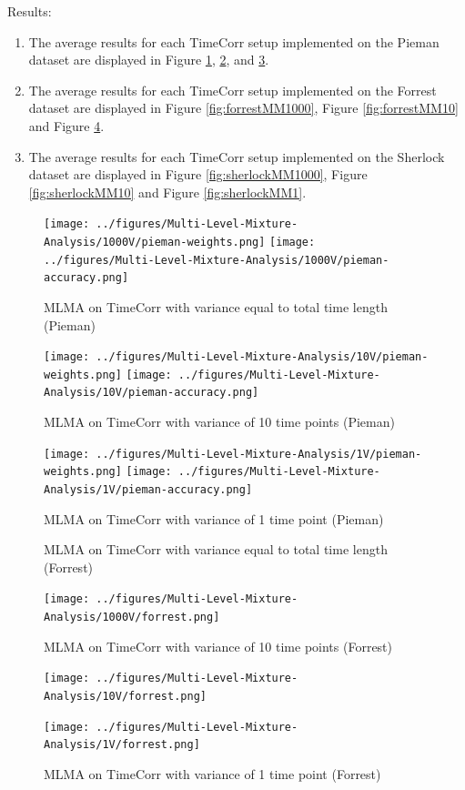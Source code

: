 \documentclass[11pt]{article}
\begin{document}
Results:
\begin{enumerate}
\item The average results for each TimeCorr setup implemented on the Pieman dataset are displayed in Figure \ref{fig:piemanMM1000}, \ref{fig:piemanMM10}, and \ref{fig:piemanMM1}.
\item The average results for each TimeCorr setup implemented on the Forrest dataset are displayed in Figure \ref{fig:forrestMM1000}, Figure \ref{fig:forrestMM10} and Figure \ref{fig:forrestMM1}.
\item The average results for each TimeCorr setup implemented on the Sherlock dataset are displayed in Figure \ref{fig:sherlockMM1000}, Figure \ref{fig:sherlockMM10} and Figure \ref{fig:sherlockMM1}.
\end{enumerate}

\begin{figure}[!htb]
\caption{MLMA on TimeCorr with variance equal to total time length (Pieman)}
\centering
\texttt{[image: ../figures/Multi-Level-Mixture-Analysis/1000V/pieman-weights.png]}
\texttt{[image: ../figures/Multi-Level-Mixture-Analysis/1000V/pieman-accuracy.png]}
\label{fig:piemanMM1000}
\end{figure}

\begin{figure}[!htb]
\caption{MLMA on TimeCorr with variance of 10 time points (Pieman)}
\centering
\texttt{[image: ../figures/Multi-Level-Mixture-Analysis/10V/pieman-weights.png]}
\texttt{[image: ../figures/Multi-Level-Mixture-Analysis/10V/pieman-accuracy.png]}
\label{fig:piemanMM10}
\end{figure}

\begin{figure}[!htb]
\caption{MLMA on TimeCorr with variance of 1 time point (Pieman)}
\centering
\texttt{[image: ../figures/Multi-Level-Mixture-Analysis/1V/pieman-weights.png]}
\texttt{[image: ../figures/Multi-Level-Mixture-Analysis/1V/pieman-accuracy.png]}
\label{fig:piemanMM1}
\end{figure}

\begin{figure}[!htb]
\caption{MLMA on TimeCorr with variance equal to total time length (Forrest)}
\centering
\texttt{[image: ../figures/Multi-Level-Mixture-Analysis/1000V/forrest.png]}
\label{fig:forrestMM1000}
\caption{MLMA on TimeCorr with variance of 10 time points (Forrest)}
\centering
\texttt{[image: ../figures/Multi-Level-Mixture-Analysis/10V/forrest.png]}
\label{fig:forrestMM10}
\caption{MLMA on TimeCorr with variance of 1 time point (Forrest)}
\centering
\texttt{[image: ../figures/Multi-Level-Mixture-Analysis/1V/forrest.png]}
\label{fig:forrestMM1}
\end{figure}
\end{document}
